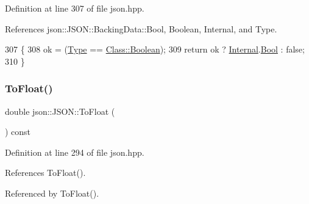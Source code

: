 Definition at line 307 of file json.\+hpp.



References json\+::\+J\+S\+O\+N\+::\+Backing\+Data\+::\+Bool, Boolean, Internal, and Type.


\begin{DoxyCode}
307                                       \{
308             ok = (\mbox{\hyperlink{classjson_1_1_j_s_o_n_a3fa6923afa41bdfe38077fbc0079aaf5}{Type}} == \mbox{\hyperlink{classjson_1_1_j_s_o_n_a762f55df6d407c1af61607ed516ffe07a27226c864bac7454a8504f8edb15d95b}{Class::Boolean}});
309             \textcolor{keywordflow}{return} ok ? \mbox{\hyperlink{classjson_1_1_j_s_o_n_a1e2a064794c3d55c8bb8887fc5734947}{Internal}}.\mbox{\hyperlink{unionjson_1_1_j_s_o_n_1_1_backing_data_a0659fafaedb7de535ae3e79e4ff4688c}{Bool}} : \textcolor{keyword}{false};
310         \}
\end{DoxyCode}
\mbox{\label{classjson_1_1_j_s_o_n_ae6ff6af2be133af569a9c3dd38f67d93}} 
\subsubsection{\texorpdfstring{To\+Float()}{ToFloat()}\hspace{0.1cm}{\footnotesize\ttfamily [1/2]}}
{\footnotesize\ttfamily double json\+::\+J\+S\+O\+N\+::\+To\+Float (\begin{DoxyParamCaption}{ }\end{DoxyParamCaption}) const\hspace{0.3cm}{\ttfamily [inline]}}



Definition at line 294 of file json.\+hpp.



References To\+Float().



Referenced by To\+Float().


